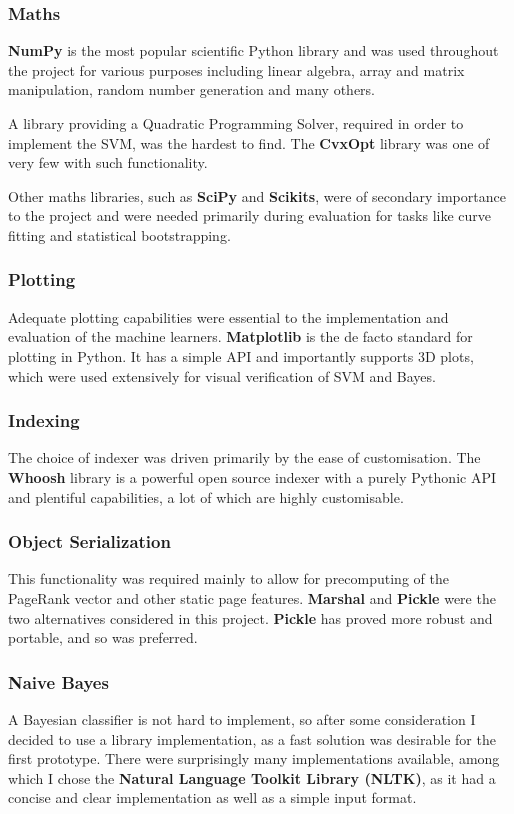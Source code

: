 \documentclass[12pt,notitlepage,twoside]{scrreprt}
\begin{document}
\subsubsection*{Maths}
\textbf{NumPy} is the most popular scientific Python library and was used throughout the
project for various purposes including linear algebra, array and matrix manipulation,
random number generation and many others.

A library providing a Quadratic Programming Solver, required in order to implement the
SVM, was the hardest to find. The \textbf{CvxOpt} library was one of very few with such
functionality.

Other maths libraries, such as \textbf{SciPy} and \textbf{Scikits}, were of secondary importance to
the project and were needed primarily during evaluation for tasks like curve fitting and
statistical bootstrapping.
\subsubsection*{Plotting}
Adequate plotting capabilities were essential to the implementation and evaluation of the
machine learners. \textbf{Matplotlib} is the de facto standard for plotting in Python. It
has a simple API and importantly supports 3D plots, which were used extensively for visual
verification of SVM and Bayes.
\subsubsection*{Indexing}
The choice of indexer was driven primarily by the ease of customisation. The
\textbf{Whoosh} library is a powerful open source indexer with a purely Pythonic API and
plentiful capabilities, a lot of which are highly
customisable.

\subsubsection*{Object Serialization}
This functionality was required mainly to allow for precomputing of the PageRank vector
and other static page features. \textbf{Marshal} and \textbf{Pickle} were the two
alternatives considered in this project. \textbf{Pickle} has proved more robust and
portable, and so was preferred.
\subsubsection*{Naive Bayes}
A Bayesian classifier is not hard to implement, so after some consideration I decided to use a library
implementation, as a fast solution was desirable for the first prototype. There were
surprisingly many implementations available, among which I chose the \textbf{Natural
Language Toolkit Library (NLTK)}, as it had a concise and clear implementation as well as a
simple input format.
\end{document}
